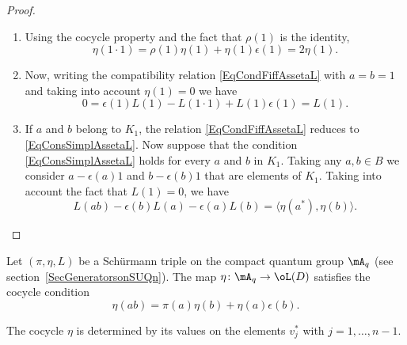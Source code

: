 \begin{proof}
	\begin{enumerate}
		\item
		      Using the cocycle property and the fact that $\rho(1)$ is the identity,
		      \begin{equation}
			      \eta(1\cdot 1)=\rho(1)\eta(1)+\eta(1)\epsilon(1)=2\eta(1).
		      \end{equation}
		\item
		      Now, writing the compatibility relation \eqref{EqCondFiffAssetaL} with $a=b=1$ and taking into account $\eta(1)=0$ we have
		      \begin{equation}
			      0=\epsilon(1)L(1)-L(1\cdot 1)+L(1)\epsilon(1)=L(1).
		      \end{equation}
		\item
		      If $a$ and $b$ belong to $K_1$, the relation \eqref{EqCondFiffAssetaL} reduces to \eqref{EqConsSimplAssetaL}. Now suppose that the condition \eqref{EqConsSimplAssetaL} holds for every $a$ and $b$ in $K_1$. Taking any $a,b\in B$ we consider $a-\epsilon(a)1$ and $b-\epsilon(b)1$ that are elements of $K_1$. Taking into account the fact that $L(1)=0$, we have
		      \begin{equation}
			      L(ab)-\epsilon(b)L(a)-\epsilon(a)L(b)=\langle \eta(a^*), \eta(b)\rangle .
		      \end{equation}
	\end{enumerate}
\end{proof}


Let $(\pi,\eta,L)$ be a Schürmann triple on the compact quantum group $\mA_q$ (see section~\ref{SecGeneratorsonSUQn}). The map $\eta\colon \mA_q\to \oL(D) $ satisfies the cocycle condition
\begin{equation}
	\eta(ab)=\pi(a)\eta(b)+\eta(a)\epsilon(b).
\end{equation}

\begin{proposition}     \label{PropCocycleDeteretavjnmu}
	The cocycle $\eta$ is determined by its values on the elements $v_j^*$ with $j=1,\ldots,n-1$.
\end{proposition}

